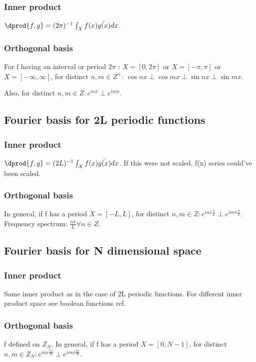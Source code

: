 \documentclass[oneside, article]{memoir}
\begin{document}
\subsubsection{Inner product}
$\dprod{f, g} = (2\pi)^{-1}\int_{X} f(x)\bar{g(x)}dx$.

\subsubsection{Orthogonal basis}
For f having an interval or period $2 \pi$ : $X = [0,2\pi]$ or $X = [-\pi,\pi]$ or $X = [-\infty, \infty]$, for distinct $n, m \in Z^{+}$: $\cos nx \perp \cos mx \perp \sin nx \perp \sin mx$.

Also, for distinct $n, m \in Z: e^{inx} \perp e^{imx}$.

\subsection{Fourier basis for 2L periodic functions}
\subsubsection{Inner product}
$\dprod{f, g} = (2L)^{-1}\int_{X} f(x)\bar{g(x)}dx$. If this were not scaled, f(x) series could've been scaled.

\subsubsection{Orthogonal basis}
In general, if f has a period $X = [-L, L]$, for distinct $n, m \in Z: e^{inx\frac{\pi}{L}} \perp e^{imx\frac{\pi}{L}}$. Frequency spectrum: $\frac{n\pi}{L} \forall n \in Z$.

\subsection{Fourier basis for N dimensional space}
\subsubsection{Inner product}
Same inner product as in the case of 2L periodic functions. For different inner product space see boolean functions ref.

\subsubsection{Orthogonal basis}
f defined on $Z_{N}$. In general, if f has a period $X = [0, N-1]$, for distinct $n, m \in Z_{N}: e^{inx\frac{2\pi}{N}} \perp e^{imx\frac{2\pi}{N}}$.
\end{document}
